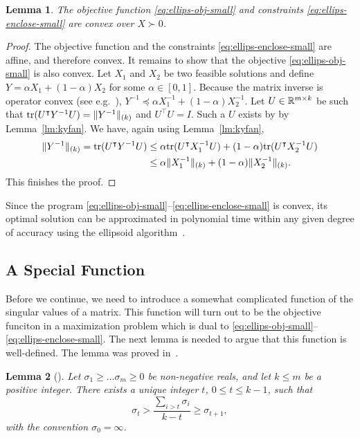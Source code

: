 \documentclass{article}
\newtheorem{lemma}{Lemma}[theorem]
\def\tr{{\rm tr}} \def\rank{{\rm rank}}
\newcommand{\tra}{\intercal}
\begin{document}
\begin{lemma}\label{lm:ellips-program-small}
  The objective function \eqref{eq:ellips-obj-small} and constraints
  \eqref{eq:ellips-enclose-small} are convex over $X \succ 0$.
\end{lemma}
\begin{proof}
  The objective function and the constraints
  \eqref{eq:ellips-enclose-small} are affine, and therefore convex. It
  remains to show that the objective \eqref{eq:ellips-obj-small} is
  also convex. Let $X_1$ and $X_2$ be two feasible solutions and
  define $Y = \alpha X_1 + (1-\alpha)X_2$ for some $\alpha \in [0,
  1]$. Because the matrix inverse is operator convex (see
  e.g.~\cite{Bhatia-MA}), $Y^{-1} \preceq \alpha X_1^{-1} + (1-\alpha)
  X_2^{-1}$. Let $U\in {\mathbb{R}}^{m\times k}$ be such that $\tr(U^\tra Y^{-1} U) =
  \|Y^{-1}\|_{(k)}$ and $U^\tra U = I$. Such a $U$ exists by by
  Lemma~\ref{lm:kyfan}. We have, again using Lemma~\ref{lm:kyfan},
  \begin{align*}
  \|Y^{-1}\|_{(k)} = \tr(U^\tra Y^{-1} U) &\leq \alpha \tr(U^\tra
  X_1^{-1}U) +  (1-\alpha) \tr(U^\tra X_2^{-1}U)\\
  &\leq  \alpha\|X_1^{-1}\|_{(k)} + (1-\alpha)\|X_2^{-1}\|_{(k)}. 
  \end{align*}
  This finishes the proof. 
\end{proof}

Since the program
\eqref{eq:ellips-obj-small}--\eqref{eq:ellips-enclose-small} is
convex, its optimal solution can be approximated in polynomial time within
any given degree of accuracy using the ellipsoid
algorithm~\cite{GLS-ellipsoid}.

\subsection{A Special Function}

Before we continue, we need to introduce a somewhat complicated
function of the singular values of a matrix. This function will turn
out to be the objective funciton in a maximization problem which is
dual to \eqref{eq:ellips-obj-small}--\eqref{eq:ellips-enclose-small}.
The next lemma is needed to argue that this function is
well-defined. The lemma was proved in~\cite{simplex}.

\begin{lemma}[\cite{simplex}]\label{lm:singvals-thresh}
  Let $\sigma_1 \geq \ldots \sigma_m \geq 0$ be non-negative reals,
  and let $k \leq m$ be a positive integer. There exists a unique integer
  $t$, $0 \leq t \leq k-1$, such that
  \begin{equation}\label{eq:singvals-thresh}
  \sigma_t > \frac{\sum_{i > t}{\sigma_i}}{k - t} \geq \sigma_{t+1},
  \end{equation}
  with the convention $\sigma_0 = \infty$. 
\end{lemma}
\end{document}
